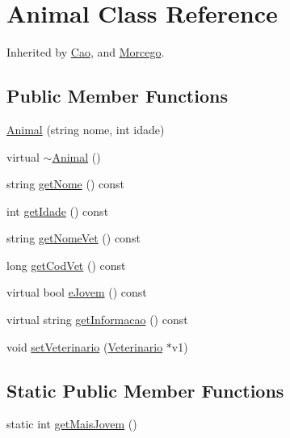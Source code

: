 \hypertarget{class_animal}{}\section{Animal Class Reference}
\label{class_animal}


Inherited by \mbox{\hyperlink{class_cao}{Cao}}, and \mbox{\hyperlink{class_morcego}{Morcego}}.

\subsection*{Public Member Functions}
\begin{DoxyCompactItemize}
\item 
\mbox{\hyperlink{class_animal_a494c55efcd03365c4effd6a0b6a6df26}{Animal}} (string nome, int idade)
\item 
virtual \mbox{\hyperlink{class_animal_a16d8b7f94611cc65f5cdb58cc105527b}{$\sim$\+Animal}} ()
\item 
string \mbox{\hyperlink{class_animal_a16dab693b54ccdb94ead24d703f6d5a6}{get\+Nome}} () const
\item 
int \mbox{\hyperlink{class_animal_aff6bba590691cc405b5641d1b071dcd5}{get\+Idade}} () const
\item 
string \mbox{\hyperlink{class_animal_a03cbd88b0804573f4957b28fc24b55d3}{get\+Nome\+Vet}} () const
\item 
long \mbox{\hyperlink{class_animal_a8958667f21bf10093ab6047deabaf341}{get\+Cod\+Vet}} () const
\item 
virtual bool \mbox{\hyperlink{class_animal_a13862612b8bcf972d764b0ef81b66324}{e\+Jovem}} () const
\item 
virtual string \mbox{\hyperlink{class_animal_aee82faf16789092dc1fde106382e2b18}{get\+Informacao}} () const
\item 
void \mbox{\hyperlink{class_animal_aafcfbc37499b51a1e2a80263b3a65fac}{set\+Veterinario}} (\mbox{\hyperlink{class_veterinario}{Veterinario}} $\ast$v1)
\end{DoxyCompactItemize}
\subsection*{Static Public Member Functions}
\begin{DoxyCompactItemize}
\item 
static int \mbox{\hyperlink{class_animal_a8d0b4ade587dd11205668b8caf2bce87}{get\+Mais\+Jovem}} ()
\end{DoxyCompactItemize}
